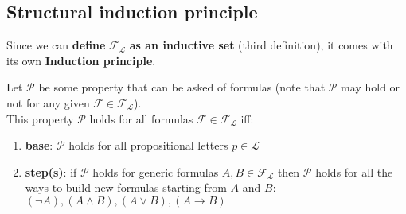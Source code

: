 	\subsection{Structural induction principle}
	Since we can \textbf{define} $\mathcal{F}_{\mathcal{L}}$ \textbf{as an inductive set} (third definition), it comes with its own \textbf{Induction principle}.

	\begin{definition}
	Let $\mathcal{P}$ be some property that can be asked of formulas (note that $\mathcal{P}$ may hold or not for any given $\mathcal{F} \in \mathcal{F}_{\mathcal{L}}$). \\

	This property $\mathcal{P}$ holds for all formulas $\mathcal{F} \in \mathcal{F}_{\mathcal{L}}$ iff:
	\begin{enumerate}
		\item \textbf{base}: $\mathcal{P}$ holds for all propositional letters $p \in \mathcal{L}$
		\item \textbf{step(s)}: if $\mathcal{P}$ holds for generic formulas $A,B \in \mathcal{F}_{\mathcal{L}}$ then $\mathcal{P}$ holds for all the ways to build new formulas starting from $A$ and $B$: $(\neg A), (A \wedge B), (A \vee B), (A \rightarrow B)$
	\end{enumerate}

	\end{definition}
